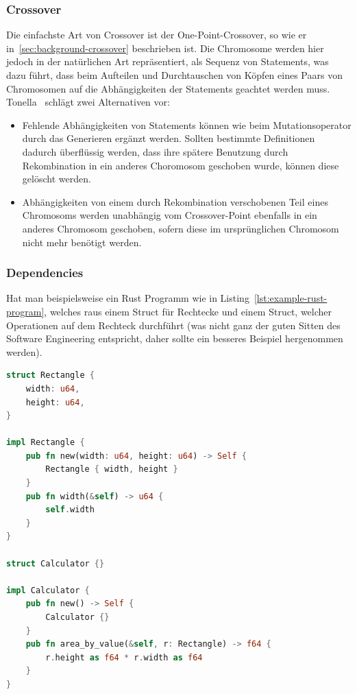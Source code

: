 \documentclass{article}
\begin{document}
\subsubsection{Crossover}
Die einfachste Art von Crossover ist der One-Point-Crossover, so wie er in~\cref{sec:background-crossover} beschrieben ist. Die Chromosome werden hier jedoch in der natürlichen Art repräsentiert, als Sequenz von Statements, was dazu führt, dass beim Aufteilen und Durchtauschen von Köpfen eines Paars von Chromosomen auf die Abhängigkeiten der Statements geachtet werden muss. Tonella~\cite{Tonella2004} schlägt zwei Alternativen vor:
\begin{itemize}
    \item Fehlende Abhängigkeiten von Statements können wie beim Mutationsoperator durch das Generieren ergänzt werden.  Sollten bestimmte Definitionen dadurch überflüssig werden, dass ihre spätere Benutzung durch Rekombination in ein anderes Choromosom geschoben wurde, können diese gelöscht werden.
    \item Abhängigkeiten von einem durch Rekombination verschobenen Teil eines Chromosoms werden unabhängig vom Crossover-Point ebenfalls in ein anderes Chromosom geschoben, sofern diese im ursprünglichen Chromosom nicht mehr benötigt werden. 
\end{itemize}

\subsubsection{Dependencies}
Hat man beispielsweise ein Rust Programm wie in Listing~\ref{lst:example-rust-program}, welches raus einem Struct für Rechtecke und einem Struct, welcher Operationen auf dem Rechteck durchführt (was nicht ganz der guten Sitten des Software Engineering entspricht, daher sollte ein besseres Beispiel hergenommen werden).

\begin{lstlisting}[language=Rust, style=boxed, caption=Ein Beispiel für ein Rust Program, label=lst:example-rust-program]
struct Rectangle {
    width: u64,
    height: u64,
}

impl Rectangle {
    pub fn new(width: u64, height: u64) -> Self {
        Rectangle { width, height }
    }
    pub fn width(&self) -> u64 {
        self.width
    }
}

struct Calculator {}

impl Calculator {
    pub fn new() -> Self {
        Calculator {}
    }
    pub fn area_by_value(&self, r: Rectangle) -> f64 {
        r.height as f64 * r.width as f64
    }
}
\end{lstlisting}
\end{document}
